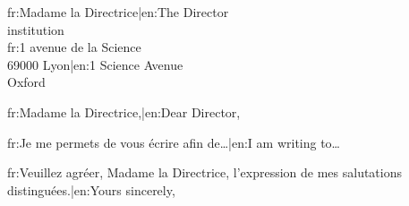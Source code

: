 \documentclass[fontsize=11pt, parskip=half]{scrlttr2}
\begin{document}
\begin{letter}{{{fr:Madame la Directrice|en:The Director}}\\{{institution}}\\{{fr:1 avenue de la Science\\69000 Lyon|en:1 Science Avenue\\Oxford}}}
  \opening{{{fr:Madame la Directrice,|en:Dear Director,}}}

  {{fr:Je me permets de vous écrire afin de…|en:I am writing to…}}

  \closing{{{fr:Veuillez agréer, Madame la Directrice, l'expression de mes salutations distinguées.|en:Yours sincerely,}}}
\end{letter}
\end{document}
